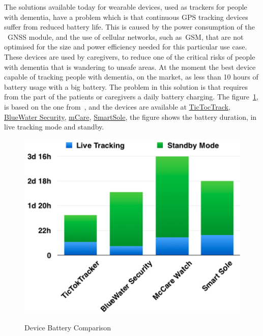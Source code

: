 The solutions available today  for wearable devices, used as trackers for people with dementia, have a problem which is that continuous GPS tracking devices suffer from reduced battery life. This is caused by the power consumption of the ~\gls{GNSS} module,  and the use of cellular networks, such as~\gls{GSM}, that are not optimised for the size and power efficiency needed for this particular use case. These devices are  used by caregivers, to reduce  one of the critical risks of people with dementia that is wandering to unsafe areas. At the moment the best device capable of tracking people with dementia,  on the market, as less than 10 hours of battery usage with a big battery.
The problem in this solution is that  requires from the part of the  patients or caregivers a daily battery charging.
The figure~\ref{fig:Device-battery-Comparison}, is based on the one from~\cite{Hadwen2017}, and the devices are available at \href{https://www.tictoctrack.com.au/}{TicTocTrack}, \href{http://www.bluewatersecurityprofessionals.com/elderlytracking.htm}{BlueWater Security},  \href{https://mcarewatch.com.au/}{mCare}, \href{https://gpssmartsole.com/gpssmartsole/}{SmartSole}, the figure shows the battery duration, in live tracking mode and  standby.\newline\newline\newline\newline\newline
\begin{figure}[htbp]
  \centering
  
    {\includegraphics[height=2.8 in,width=0.55\linewidth]{Chapters/Figures/21.png}}%
 
  \caption{Device Battery Comparison}
  \label{fig:Device-battery-Comparison}
\end{figure}

